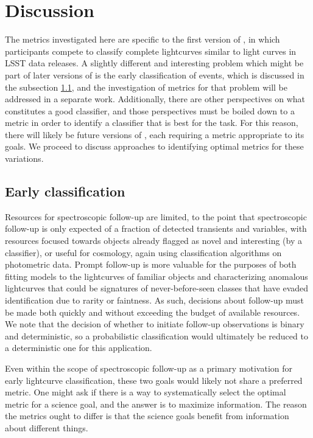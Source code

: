 \section{Discussion}
\label{sec:discussion}
The metrics investigated here are specific to the first version of \plasticc, in which participants compete to classify complete lightcurves similar to light curves in LSST data releases.
A slightly different and interesting problem which might be part of later versions of \plasticc is the early classification of events, which is discussed in the subsection \ref{sec:early}, and the investigation of metrics for that problem will be addressed in a separate work.
Additionally, there are other perspectives on what constitutes a good classifier, and those perspectives must be boiled down to a metric in order to identify a classifier that is best for the task.
For this reason, there will likely be future versions of \plasticc, each requiring a metric appropriate to its goals.
We proceed to discuss approaches to identifying optimal metrics for these variations.

\subsection{Early classification}
\label{sec:early}

Resources for spectroscopic follow-up are limited, to the point that spectroscopic follow-up is only expected of a fraction of detected transients and variables, with resources focused towards objects already flagged as novel and interesting (by a classifier), or useful for cosmology, again using classification algorithms on photometric data.
Prompt follow-up is more valuable for the purposes of both fitting models to the lightcurves of familiar objects and characterizing anomalous lightcurves that could be signatures of never-before-seen classes that have evaded identification due to rarity or faintness.
As such, decisions about follow-up must be made both quickly and without exceeding the budget of available resources.
We note that the decision of whether to initiate follow-up observations is binary and deterministic, so a probabilistic classification would ultimately be reduced to a deterministic one for this application.

Even within the scope of spectroscopic follow-up as a primary motivation for early lightcurve classification, these two goals would likely not share a preferred metric.
One might ask if there is a way to systematically select the optimal metric for a science goal, and the answer is to maximize information.
The reason the metrics ought to differ is that the science goals benefit from information about different things.

